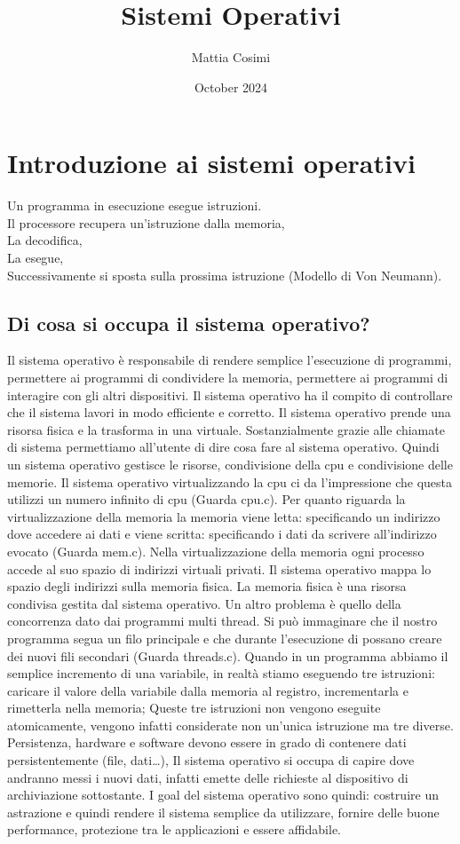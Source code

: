 \documentclass{article}
\title{Sistemi Operativi}
\author{Mattia Cosimi}
\date{October 2024}
\begin{document}
\maketitle

\section{Introduzione ai sistemi operativi}
Un programma in esecuzione esegue istruzioni. \\
Il processore recupera un’istruzione dalla memoria,\\
La decodifica,\\
La esegue,\\
Successivamente si sposta sulla prossima istruzione (Modello di Von Neumann).\\
\subsection{Di cosa si occupa il sistema operativo?}
Il sistema operativo è responsabile di rendere semplice l’esecuzione di programmi, permettere ai programmi di condividere la memoria, permettere ai programmi di interagire con gli altri dispositivi. Il sistema operativo ha il compito di controllare che il sistema lavori in modo efficiente e corretto. Il sistema operativo prende una risorsa fisica e la trasforma in una virtuale. Sostanzialmente grazie alle chiamate di sistema permettiamo all’utente di dire cosa fare al sistema operativo. Quindi un sistema operativo gestisce le risorse, condivisione della cpu e condivisione delle memorie. Il sistema operativo virtualizzando la cpu ci da l’impressione che questa utilizzi un numero infinito di cpu (Guarda cpu.c). Per quanto riguarda la virtualizzazione della memoria la memoria viene letta: specificando un indirizzo dove accedere ai dati e viene scritta: specificando i dati da scrivere all’indirizzo evocato (Guarda mem.c). Nella virtualizzazione della memoria ogni processo accede al suo spazio di indirizzi virtuali privati. Il sistema operativo mappa lo spazio degli indirizzi sulla memoria fisica. La memoria fisica è una risorsa condivisa gestita dal sistema operativo. Un altro problema è quello della concorrenza dato dai programmi multi thread. Si può immaginare che il nostro programma segua un filo principale e che durante l’esecuzione di possano creare dei nuovi fili secondari (Guarda threads.c). Quando in un programma abbiamo il semplice incremento di una variabile, in realtà stiamo eseguendo tre istruzioni: caricare il valore della variabile dalla memoria al registro, incrementarla e rimetterla nella memoria; Queste tre istruzioni non vengono eseguite atomicamente, vengono infatti considerate non un'unica istruzione ma tre diverse. Persistenza, hardware e software devono essere in grado di contenere dati persistentemente (file, dati…), Il sistema operativo si occupa di capire dove andranno messi i nuovi dati, infatti emette delle richieste al dispositivo di archiviazione sottostante. I goal del sistema operativo sono quindi: costruire un astrazione e quindi rendere il sistema semplice da utilizzare, fornire delle buone performance, protezione tra le applicazioni e essere affidabile.
\end{document}

